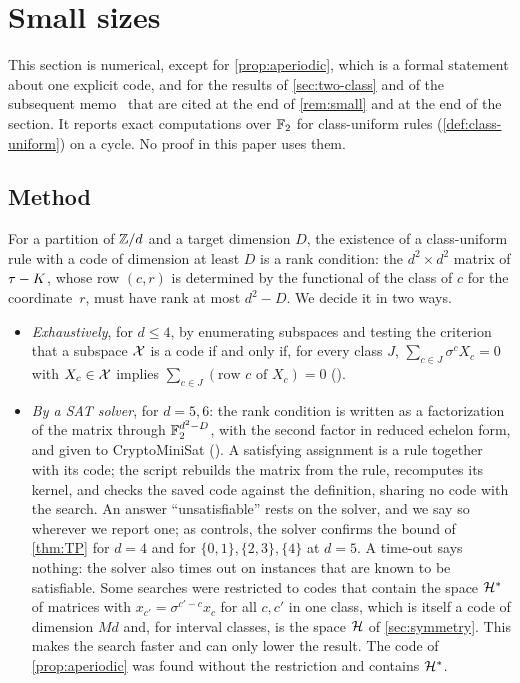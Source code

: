 \section{Small sizes}\label{sec:small}

This section is numerical, except for \cref{prop:aperiodic}, which is a formal statement about one explicit code, and
for the results of \cref{sec:two-class} and of the subsequent memo~\cite{ClassUniformMemo2026} that are cited at the
end of \cref{rem:small} and at the end of the section. It reports exact computations over $\mathbb{F}_2$ for class-uniform rules
(\cref{def:class-uniform}) on a cycle. No proof in this paper uses them.

\subsection{Method}

For a partition of $\mathbb{Z}/d$ and a target dimension $D$, the existence of a class-uniform rule with a code of dimension at
least $D$ is a rank condition: the $d^2\times d^2$ matrix of $\tau-K$, whose row $(c,r)$ is determined by the functional
of the class of $c$ for the coordinate~$r$, must have rank at most $d^2-D$. We decide it in two ways.
\begin{itemize}[leftmargin=1.5em]
\item \emph{Exhaustively}, for $d\le4$, by enumerating subspaces and testing the criterion that a subspace $\mathcal{X}$ is a code
if and only if, for every class $J$, $\sum_{c\in J}\sigma^cX_c=0$ with $X_c\in\mathcal{X}$ implies
$\sum_{c\in J}(\text{row }c\text{ of }X_c)=0$ ().
\item \emph{By a SAT solver}, for $d=5,6$: the rank condition is written as a factorization of the matrix through
$\mathbb{F}_2^{d^2-D}$, with the second factor in reduced echelon form, and given to
CryptoMiniSat (). A satisfying assignment is a rule together with its code; the
script rebuilds the matrix from the rule, recomputes its kernel, and 
checks the saved code against the definition, sharing no code with the search. An answer ``unsatisfiable'' rests on the
solver, and we say so wherever we report one; as controls, the solver confirms the bound of \cref{thm:TP} for $d=4$ and
for $\{0,1\},\{2,3\},\{4\}$ at $d=5$. A time-out says nothing: the solver also times out on instances that are known to
be satisfiable. Some searches were restricted to codes that contain the space $\mathcal{H}^*$ of matrices with
$x_{c'}=\sigma^{c'-c}x_c$ for all $c,c'$ in one class, which is itself a code of dimension $Md$ and, for interval
classes, is the space $\mathcal{H}$ of \cref{sec:symmetry}. This makes the search faster and can only lower the result. The
code of \cref{prop:aperiodic} was found without the restriction and contains $\mathcal{H}^*$.
\end{itemize}

